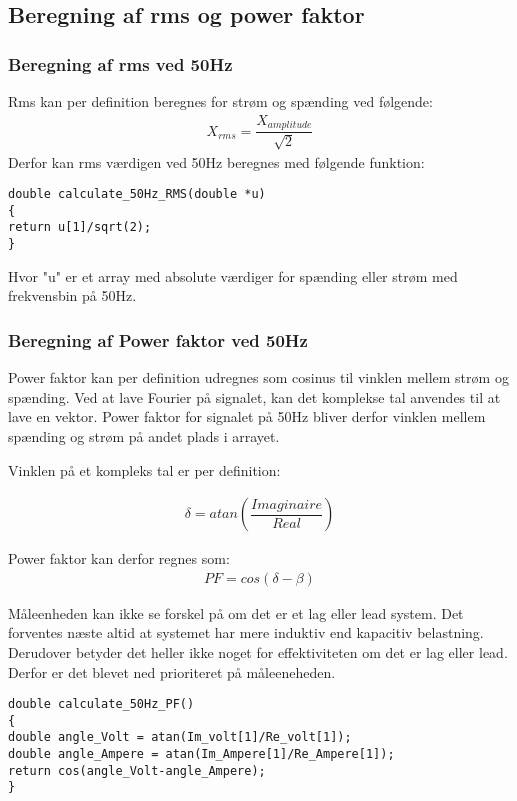 \subsection{Beregning af rms og power faktor}

\subsubsection{Beregning af rms ved 50Hz}
Rms kan per definition beregnes for strøm og spænding ved følgende: 
\begin{align}
 X_{rms}= \dfrac{X_{amplitude}}{\sqrt{2}}
\end{align}
Derfor kan rms værdigen ved 50Hz beregnes med følgende funktion:
\begin{lstlisting}
double calculate_50Hz_RMS(double *u)
{
return u[1]/sqrt(2);  
}
\end{lstlisting}

Hvor "u" er et array med absolute værdiger for spænding eller strøm med frekvensbin på 50Hz.

\subsubsection{Beregning af Power faktor ved 50Hz}

Power faktor kan per definition udregnes som cosinus til vinklen mellem strøm og spænding. Ved at lave Fourier på signalet, kan det komplekse tal anvendes til at lave en vektor. Power faktor for signalet på 50Hz bliver derfor vinklen mellem spænding og strøm på andet plads i arrayet.

Vinklen på et kompleks tal er per definition:

\begin{align}
\delta = atan(\dfrac{Imaginaire}{Real})
\end{align}

Power faktor kan derfor regnes som:
\begin{align}
PF = cos(\delta - \beta)
\end{align}

Måleenheden kan ikke se forskel på om det er et lag eller lead system. Det forventes næste altid at systemet har mere induktiv end kapacitiv belastning. Derudover betyder det heller ikke noget for effektiviteten om det er lag eller lead. Derfor er det blevet ned prioriteret på måleeneheden.

\begin{lstlisting}
double calculate_50Hz_PF()
{
double angle_Volt = atan(Im_volt[1]/Re_volt[1]);
double angle_Ampere = atan(Im_Ampere[1]/Re_Ampere[1]);    
return cos(angle_Volt-angle_Ampere);
}
\end{lstlisting}
 
    

  
